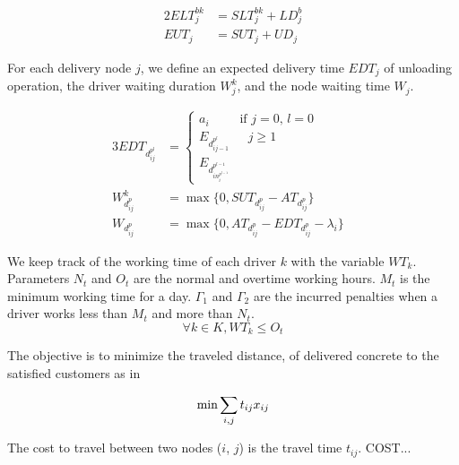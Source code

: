 \documentclass{article}
\begin{document}
{\begin{alignat}{2}
    \label{eq:ELT}  ELT^{bk}_{j} &= SLT^{bk}_{j}+ LD^b_{j}\\
    \label{eq:S}         EUT_{j} & = SUT_{j} + UD_{j}
\end{alignat}

For each delivery node $j$, we define an expected delivery time $EDT_{j}$ of unloading operation, the driver waiting duration $W^k_{j}$, and the node waiting time $W_{j}$.


\begin{alignat}{3}
    \label{eq:ES} EDT_{d^{p^l}_{ij}} &=
          \begin{cases}
            a_i & \text{if $j=0$, $l=0$}\\
            E_{d^{p^l}_{ij-1}} & \text{ $j \geq 1$}\\
            E_{d^{p^{l-1}}_{in^{p^{l-1}}_i}}  & 
          \end{cases} &  \\
    \label{eq:Wd} W^k_{d^p_{ij}} &= \max\{0, SUT_{d^p_{ij}} - AT_{d^p_{ij}}\} & \\
    \label{eq:Wc} W_{d^p_{ij}} & = \max\{0, AT_{d^p_{ij}} - EDT_{d^p_{ij}}- \lambda_i \} &
\end{alignat}


We keep track of the working time of each driver $k$ with the variable $WT_k$. Parameters $N_t$ and $O_t$ are the normal and overtime working hours. $M_t$ is the minimum working time for a day. $\Gamma_1$ and $\Gamma_2$ are the incurred penalties when a driver works less than $M_t$ and more than $N_t$.
\begin{equation}
    \forall k \in K, WT_k \leq O_t 
\end{equation}

The objective is to minimize the traveled distance,
 of delivered concrete to the satisfied customers as in

\begin{equation}
    \min \smashoperator{\sum_{i,j}}{t_{ij}x_{ij}}
\end{equation}


The cost to travel between two nodes ($i$, $j$) is the travel time $t_{ij}$. COST...



}
\end{document}
